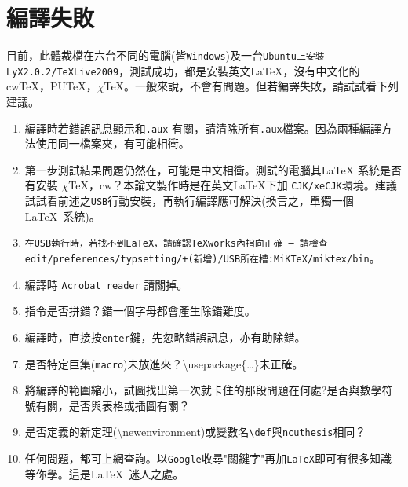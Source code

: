 \section{編譯失敗}
目前，此體裁檔在六台不同的電腦(皆{\tt Windows})及一台{\tt Ubuntu上安裝LyX2.0.2/TeXLive2009}，測試成功，都是安裝英文\LaTeX{}，沒有中文化的cw\TeX，PU\TeX，$\chi$\TeX。一般來說，不會有問題。但若編譯失敗，請試試看下列建議。
\begin{enumerate}
\item 編譯時若錯誤訊息顯示和{\tt .aux} 有關，請清除所有{\tt *.aux}檔案。因為兩種編譯方法使用同一檔案夾，有可能相衝。 
\item 第一步測試結果問題仍然在，可能是中文相衝。測試的電腦其\LaTeX{ }系統是否有安裝 $\chi$\TeX，cw？本論文製作時是在英文\LaTeX{}下加 {\tt CJK/xeCJK}環境。建議試試看前述之{\tt USB}行動安裝，再執行編譯應可解決(換言之，單獨一個\LaTeX\ 系統)。
\item {\color{red}\tt 在USB執行時，若找不到\LaTeX，請確認TeXworks內指向正確 --- 請檢查edit/preferences/typsetting/+(新增)/USB所在槽:MiKTeX/miktex/bin}。
\item 編譯時 {\tt Acrobat reader} 請關掉。
\item 指令是否拼錯？錯一個字母都會產生除錯難度。
\item 編譯時，直接按{\tt enter}鍵，先忽略錯誤訊息，亦有助除錯。
\item 是否特定巨集({\tt macro})未放進來？\textbackslash usepackage\{\ldots\}未正確。
\item 將編譯的範圍縮小，試圖找出第一次就卡住的那段問題在何處?是否與數學符號有關，是否與表格或插圖有關？
\item 是否定義的新定理(\textbackslash newenvironment)或變數名{\verb|\def|}與{\tt ncuthesis}相同？
\item 任何問題，都可上網查詢。以{\tt Google}收尋"關鍵字"再加{\tt LaTeX}即可有很多知識等你學。這是\LaTeX\ 迷人之處。
\end{enumerate}

